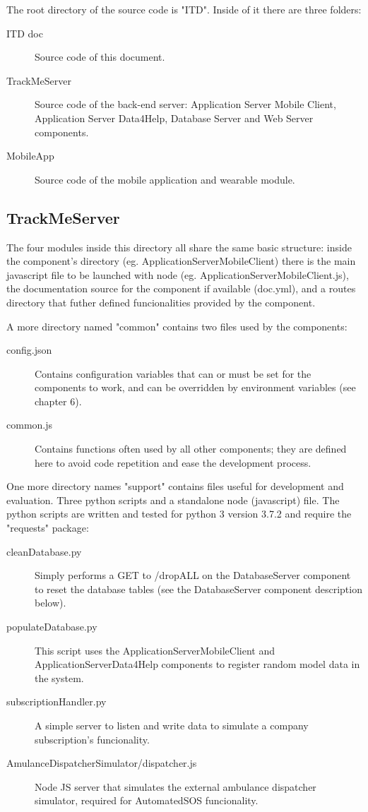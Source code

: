 \documentclass[../main.tex]{subfiles}
\begin{document}
The root directory of the source code is "ITD". Inside of it there are three folders:

\begin{description}
	\item[ITD doc] Source code of this document.
	\item[TrackMeServer] Source code of the back-end server: Application Server Mobile Client, Application Server Data4Help, Database Server and Web Server components.
	\item[MobileApp] Source code of the mobile application and wearable module.
\end{description}

\subsection{TrackMeServer}

The four modules inside this directory all share the same basic structure: inside the component's directory (eg. ApplicationServerMobileClient) there is the main javascript file to be launched with node (eg. ApplicationServerMobileClient.js), the documentation source for the component if available (doc.yml), and a routes directory that futher defined funcionalities provided by the component.

A more directory named "common" contains two files used by the components:

\begin{description}
	\item[config.json] Contains configuration variables that can or must be set for the components to work, and can be overridden by environment variables (see chapter 6).
	\item[common.js] Contains functions often used by all other components; they are defined here to avoid code repetition and ease the development process.
\end{description}

One more directory names "support" contains files useful for development and evaluation. Three python scripts and a standalone node (javascript) file. The python scripts are written and tested for python 3 version 3.7.2 and require the "requests" package:

\begin{description}
	\item[cleanDatabase.py] Simply performs a GET to /dropALL on the DatabaseServer component to reset the database tables (see the DatabaseServer component description below).
	\item[populateDatabase.py] This script uses the ApplicationServerMobileClient and ApplicationServerData4Help components to register random model data in the system.
	\item[subscriptionHandler.py] A simple server to listen and write data to simulate a company subscription's funcionality.
	\item[AmulanceDispatcherSimulator/dispatcher.js] Node JS server that simulates the external ambulance dispatcher simulator, required for AutomatedSOS funcionality.
\end{description}
\end{document}
